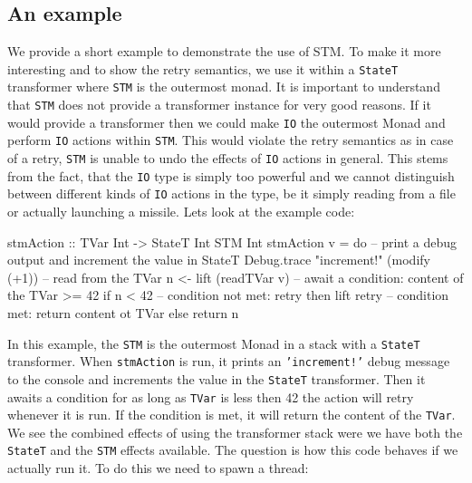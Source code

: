 \subsection{An example}
We provide a short example to demonstrate the use of STM. To make it more interesting and to show the retry semantics, we use it within a \texttt{StateT} transformer where \texttt{STM} is the outermost monad. It is important to understand that \texttt{STM} does not provide a transformer instance for very good reasons. If it would provide a transformer then we could make \texttt{IO} the outermost Monad and perform \texttt{IO} actions within \texttt{STM}. This would violate the retry semantics as in case of a retry, \texttt{STM} is unable to undo the effects of \texttt{IO} actions in general. This stems from the fact, that the \texttt{IO} type is simply too powerful and we cannot distinguish between different kinds of \texttt{IO} actions in the type, be it simply reading from a file or actually launching a missile. %
Lets look at the example code:

\begin{HaskellCode}
stmAction :: TVar Int -> StateT Int STM Int 
stmAction v = do
  -- print a debug output and increment the value in StateT 
  Debug.trace "increment!" (modify (+1))
  -- read from the TVar
  n <- lift (readTVar v)
  -- await a condition: content of the TVar >= 42
  if n < 42
    -- condition not met: retry
    then lift retry
    -- condition met: return content ot TVar
    else return n
\end{HaskellCode}

In this example, the \texttt{STM} is the outermost Monad in a stack with a \texttt{StateT} transformer. When \texttt{stmAction} is run, it prints an \texttt{'increment!'} debug message to the console and increments the value in the \texttt{StateT} transformer. Then it awaits a condition for as long as \texttt{TVar} is less then 42 the action will retry whenever it is run. If the condition is met, it will return the content of the \texttt{TVar}. We see the combined effects of using the transformer stack were we have both the \texttt{StateT} and the \texttt{STM} effects available. The question is how this code behaves if we actually run it. To do this we need to spawn a thread:

